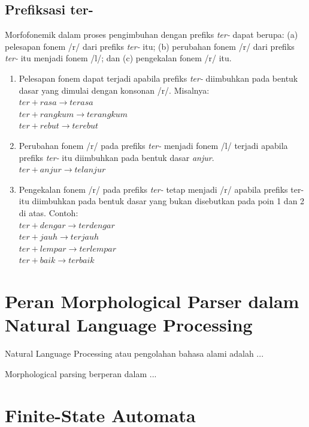 \subsection{Prefiksasi ter-}
\label{sec:prefiksasiTer-}

Morfofonemik dalam proses pengimbuhan dengan prefiks \textit{ter-} dapat berupa: (a) pelesapan fonem /r/ dari prefiks \textit{ter-} itu; (b) perubahan fonem /r/ dari prefiks \textit{ter-} itu menjadi fonem /l/; dan (c) pengekalan fonem /r/ itu. 

\begin{enumerate}
	\item Pelesapan fonem dapat terjadi apabila prefiks \textit{ter-} diimbuhkan pada bentuk dasar yang dimulai dengan konsonan /r/. Misalnya:\\
	$ter + rasa \rightarrow terasa$\\
	$ter + rangkum \rightarrow terangkum$\\
	$ter + rebut \rightarrow terebut$
	
	\item Perubahan fonem /r/ pada prefiks \textit{ter-} menjadi fonem /l/ terjadi apabila prefiks \textit{ter-} itu diimbuhkan pada bentuk dasar \textit{anjur}.\\
	$ter + anjur \rightarrow telanjur$
	
	\item Pengekalan fonem /r/ pada prefiks \textit{ter-} tetap menjadi /r/ apabila prefiks ter- itu diimbuhkan pada bentuk dasar yang bukan disebutkan pada poin 1 dan 2 di atas. Contoh:\\
	$ter + dengar \rightarrow terdengar$\\	
	$ter + jauh \rightarrow terjauh$\\
	$ter + lempar \rightarrow terlempar$\\
	$ter + baik \rightarrow terbaik$
	
\end{enumerate}


\section{Peran Morphological Parser dalam Natural Language Processing}
\label{sec:peranParser}

Natural Language Processing atau pengolahan bahasa alami adalah ...

Morphological parsing berperan dalam ...


\section{Finite-State Automata}
\label{sec:automata}

